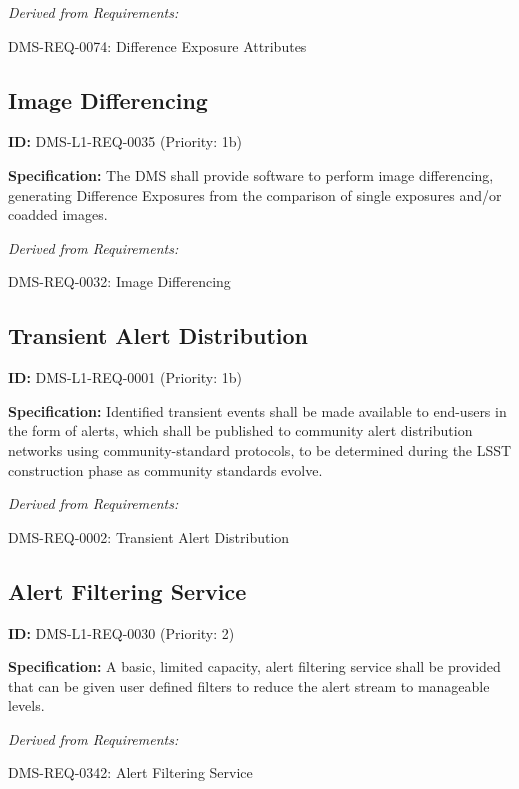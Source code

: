 \documentclass[SE,toc,lsstdraft]{lsstdoc}
\begin{document}
\emph{Derived from Requirements:}

DMS-REQ-0074:
Difference Exposure Attributes \newline

\subsection{Image Differencing}

\label{DMS-L1-REQ-0035}
\textbf{ID:} DMS-L1-REQ-0035 (Priority: 1b)

\textbf{Specification:} The DMS shall provide software to perform image differencing, generating Difference Exposures from the comparison of single exposures and/or coadded images.

\emph{Derived from Requirements:}

DMS-REQ-0032:
Image Differencing \newline

\subsection{Transient Alert Distribution}

\label{DMS-L1-REQ-0001}
\textbf{ID:} DMS-L1-REQ-0001 (Priority: 1b)

\textbf{Specification:} Identified transient events shall be made available to end-users in the form of alerts, which shall be published to community alert distribution networks using community-standard protocols, to be determined during the LSST construction phase as community standards evolve.

\emph{Derived from Requirements:}

DMS-REQ-0002:
Transient Alert Distribution \newline

\subsection{Alert Filtering Service}

\label{DMS-L1-REQ-0030}
\textbf{ID:} DMS-L1-REQ-0030 (Priority: 2)

\textbf{Specification:} A basic, limited capacity, alert filtering service shall be provided that can be given user defined filters to reduce the alert stream to manageable levels.

\emph{Derived from Requirements:}

DMS-REQ-0342:
Alert Filtering Service \newline
\end{document}
